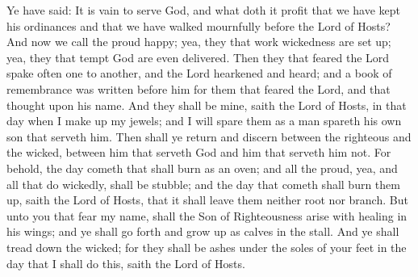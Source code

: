 Ye have said: It is vain to serve God, and what doth it profit that we have kept his ordinances and that we have walked mournfully before the Lord of Hosts?
\bverse \iffalse And now we call the proud happy; yea, they that work wickedness are set up; yea, they that tempt God are even delivered. \fi
And now we call the proud happy; yea, they that work wickedness are set up; yea, they that tempt God are even delivered.
\bverse \iffalse Then they that feared the Lord spake often one to another, and the Lord hearkened and heard; and a book of remembrance was written before him for them that feared the Lord, and that thought upon his name. \fi
Then they that feared the Lord spake often one to another, and the Lord hearkened and heard; and a book of remembrance was written before him for them that feared the Lord, and that thought upon his name.
\bverse \iffalse And they shall be mine, saith the Lord of Hosts, in that day when I make up my jewels; and I will spare them as a man spareth his own son that serveth him. \fi
And they shall be mine, saith the Lord of Hosts, in that day when I make up my jewels; and I will spare them as a man spareth his own son that serveth him.
\bverse \iffalse Then shall ye return and discern between the righteous and the wicked, between him that serveth God and him that serveth him not. \fi
Then shall ye return and discern between the righteous and the wicked, between him that serveth God and him that serveth him not.
\bchapter
\bverse \iffalse For behold, the day cometh that shall burn as an oven; and all the proud, yea, and all that do wickedly, shall be stubble; and the day that cometh shall burn them up, saith the Lord of Hosts, that it shall leave them neither root nor branch. \fi
For behold, the day cometh that shall burn as an oven; and all the proud, yea, and all that do wickedly, shall be stubble; and the day that cometh shall burn them up, saith the Lord of Hosts, that it shall leave them neither root nor branch.
\bverse \iffalse But unto you that fear my name, shall the Son of Righteousness arise with healing in his wings; and ye shall go forth and grow up as calves in the stall. \fi
But unto you that fear my name, shall the Son of Righteousness arise with healing in his wings; and ye shall go forth and grow up as calves in the stall.
\bverse \iffalse And ye shall tread down the wicked; for they shall be ashes under the soles of your feet in the day that I shall do this, saith the Lord of Hosts. \fi
And ye shall tread down the wicked; for they shall be ashes under the soles of your feet in the day that I shall do this, saith the Lord of Hosts.
